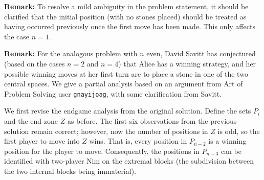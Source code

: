 \documentclass[amssymb,twocolumn,pra,10pt,aps]{revtex4-1}
\begin{document}
\begin{itemize}
\textbf{Remark:}
To resolve a mild ambiguity in the problem statement, it should be clarified that the initial position (with no stones placed) should be treated as having occurred previously once the first move has been made. This only affects the case $n=1$.

\textbf{Remark:}
For the analogous problem with $n$ even, David Savitt has conjectured (based on the cases $n=2$ and $n=4$) that Alice has a winning strategy, and her possible winning moves at her first turn are to place a stone in one of the two central spaces. We give a partial analysis based on an argument from Art of Problem Solving user \texttt{gnayijoag}, with some clarification from Savitt.

We first revise the endgame analysis from the original solution. Define the sets $P_i$ and the end zone $Z$ as before. The first six observations from the previous solution remain correct; however, now the number of positions in $Z$ is odd, so the first player to move into $Z$ wins. That is, every position in $P_{n-2}$ is a winning position for the player to move. Consequently, the positions in $P_{n-3}$ can be identified with two-player Nim on the extremal blocks (the subdivision between the two internal blocks being immaterial).


\end{itemize}
\end{document}
